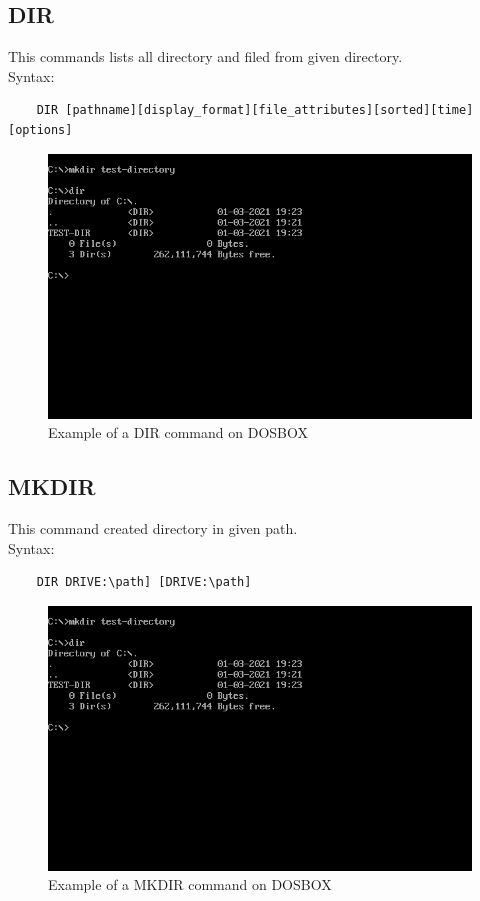 \documentclass[17pt,a4paper,oneside,margin=1in]{article}
\begin{document}
\subsection{DIR}
This commands lists all directory and filed from given directory. \\
Syntax:\\
\begin{verbatim}
	DIR [pathname][display_format][file_attributes][sorted][time][options]
\end{verbatim}
\begin{figure}[h]
	\caption{Example of a DIR command on DOSBOX}
	\centering
	\includegraphics[width=1\textwidth]{./scrot/dir.png}
\end{figure}
\pagebreak


\subsection{MKDIR}
This command created directory in given path. \\
Syntax: \\
\begin{verbatim}
	DIR DRIVE:\path] [DRIVE:\path]	
\end{verbatim}
\begin{figure}[h]
	\caption{Example of a MKDIR command on DOSBOX}
	\centering
	\includegraphics[width=1\textwidth]{./scrot/dir.png}
\end{figure}
\pagebreak
\end{document}
